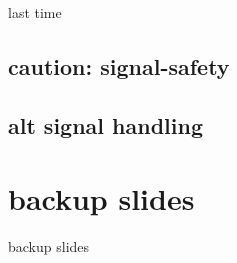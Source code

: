\date{}
\title{}
\date{}

\begin{frame}
    \titlepage
\end{frame}



\begin{frame}{last time}
\end{frame}

\subsection{caution: signal-safety}


\subsection{alt signal handling}




\section{backup slides}
\begin{frame}{backup slides}
\end{frame}






